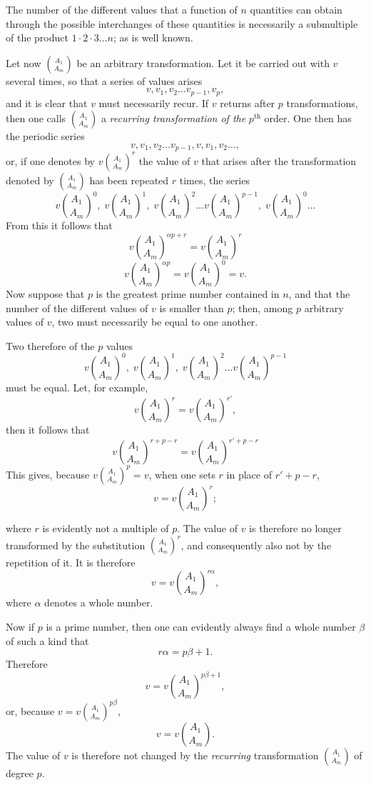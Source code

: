 \documentclass{article}
\begin{document}
The number of the different values that a function of $n$ quantities can obtain through the possible interchanges of these quantities is necessarily a submultiple of the product $1 \cdot 2 \cdot 3 \ldots n$; as is well known.

Let now $\binom{A_1}{A_m}$ be an arbitrary transformation. Let it be carried out with $v$ several times, so that a series of values arises
\[ v, v_1, v_2 \ldots v_{p-1}, v_p, \]
and it is clear that $v$ must necessarily recur. If $v$ returns after $p$ transformations, then one calls $\binom{A_1}{A_m}$ a \emph{recurring transformation of the} $p^{\text{th}}$ order. One then has the periodic series
\[ v, v_1, v_2 \ldots v_{p-1}, v, v_1, v_2 \ldots, \]
or, if one denotes by $v\binom{A_1}{A_m}^{r}$ the value of $v$ that arises after the transformation denoted by $\binom{A_1}{A_m}$ has been repeated $r$ times, the series
\[ v\binom{A_1}{A_m}^{0}, \; v\binom{A_1}{A_m}^{1}, \; v\binom{A_1}{A_m}^{2} \ldots v\binom{A_1}{A_m}^{p-1}, \; v\binom{A_1}{A_m}^{0} \ldots \]
From this it follows that
\[ v\binom{A_1}{A_m}^{\alpha p + r} = v\binom{A_1}{A_m}^{r} \]
\[ v\binom{A_1}{A_m}^{\alpha p} = v\binom{A_1}{A_m}^{0} = v. \]
Now suppose that $p$ is the greatest prime number contained in $n$, and that the number of the different values of $v$ is smaller than $p$; then, among $p$ arbitrary values of $v$, two must necessarily be equal to one another.

Two therefore of the $p$ values
\[ v\binom{A_1}{A_m}^{0}, \; v\binom{A_1}{A_m}^{1}, \; v\binom{A_1}{A_m}^{2} \ldots v\binom{A_1}{A_m}^{p-1} \]
must be equal. Let, for example,
\[ v\binom{A_1}{A_m}^{r} = v\binom{A_1}{A_m}^{r'}, \]
then it follows that
\[ v\binom{A_1}{A_m}^{r + p - r} = v\binom{A_1}{A_m}^{r' + p - r} \]
This gives, because $v\binom{A_1}{A_m}^{p} = v$, when one sets $r$ in place of $r' + p - r$,
\[ v = v\binom{A_1}{A_m}^{r}; \]

where $r$ is evidently not a multiple of $p$. The value of $v$ is therefore no longer transformed by the substitution $\binom{A_1}{A_m}^{r}$, and consequently also not by the repetition of it. It is therefore
\[ v = v\binom{A_1}{A_m}^{r\alpha}, \]
where $\alpha$ denotes a whole number.

Now if $p$ is a prime number, then one can evidently always find a whole number $\beta$ of such a kind that
\[ r\alpha = p\beta + 1. \]
Therefore
\[ v = v\binom{A_1}{A_m}^{p\beta + 1}, \]
or, because $v = v\binom{A_1}{A_m}^{p\beta}$,
\[ v = v\binom{A_1}{A_m}. \]
The value of $v$ is therefore not changed by the \emph{recurring} transformation $\binom{A_1}{A_m}$ of degree $p$.
\end{document}
